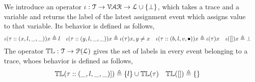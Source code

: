 We introduce an operator $\iota : \mathcal{T} \to \mathcal{VAR} \to \mathcal{L} \cup \{\bot\}$, which 
takes a trace and a variable and returns the label of the latest assignment event which assigns value to that variable.
Its behavior is defined as follows,
  \[
  \iota(\mathtt{\tau}  :: (x, l, \_, \_)) x \triangleq l
  ~~~
  \iota(\mathtt{\tau}  :: (y, l, \_, \_)) x \triangleq \iota(\mathtt{\tau} ) x, y \neq x
  ~~~
  \iota(\mathtt{\tau} :: (b, l, v, \bullet)) x \triangleq \iota(\mathtt{\tau}) x
  ~~~
  \iota({[]}) x \triangleq \bot
  \]
%
  The operator $\mathbb{TL} : \mathcal{T} \to \mathcal{P}{(\mathcal{L})}$ gives the set of labels in every event belonging to 
  a trace, whoes behavior is defined as follows,
\[
\mathbb{TL}{(\mathtt{\tau}  :: (\_, l, \_, \_)])} \triangleq \{l\} \cup \mathbb{TL}{(\mathtt{\tau} )}
~~~
\mathbb{TL}({[ ]}) \triangleq \{\}
\]
